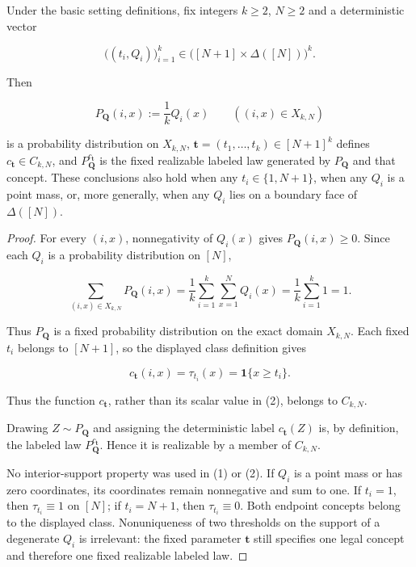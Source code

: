 \begin{lemma}\label{lem:step-006-fixed-product-realizable}
Under the basic setting definitions, fix integers \(k\ge2\), \(N\ge2\)
and a deterministic vector

\[
\bigl((t_i,Q_i)\bigr)_{i=1}^k
\in\bigl([N+1]\times\Delta([N])\bigr)^k.
\]

Then

\[
P_{\boldsymbol Q}(i,x):=\frac1kQ_i(x)
\qquad((i,x)\in X_{k,N})
\]

is a probability distribution on \(X_{k,N}\),
\(\boldsymbol t=(t_1,\ldots,t_k)\in[N+1]^k\) defines
\(c_{\boldsymbol t}\in C_{k,N}\), and
\(P_{\boldsymbol Q}^{c_{\boldsymbol t}}\) is the fixed realizable
labeled law generated by \(P_{\boldsymbol Q}\) and that concept. These
conclusions also hold when any \(t_i\in\{1,N+1\}\), when any \(Q_i\) is
a point mass, or, more generally, when any \(Q_i\) lies on a boundary face
of \(\Delta([N])\).
\end{lemma}

\begin{proof}
For every \((i,x)\), nonnegativity of \(Q_i(x)\) gives
\(P_{\boldsymbol Q}(i,x)\ge0\). Since each \(Q_i\) is a probability
distribution on \([N]\),

\[
\sum_{(i,x)\in X_{k,N}}P_{\boldsymbol Q}(i,x)
=\frac1k\sum_{i=1}^k\sum_{x=1}^NQ_i(x)
=\frac1k\sum_{i=1}^k1
=1.
\tag{1}
\]

Thus \(P_{\boldsymbol Q}\) is a fixed probability distribution on the
exact domain \(X_{k,N}\). Each fixed \(t_i\) belongs to \([N+1]\), so
the displayed class definition gives

\[
c_{\boldsymbol t}(i,x)=\tau_{t_i}(x)
=\mathbf 1\{x\ge t_i\}.
\tag{2}
\]

Thus the function \(c_{\boldsymbol t}\), rather than its scalar value in
(2), belongs to \(C_{k,N}\).

Drawing \(Z\sim P_{\boldsymbol Q}\) and assigning the deterministic label
\(c_{\boldsymbol t}(Z)\) is, by definition, the labeled law
\(P_{\boldsymbol Q}^{c_{\boldsymbol t}}\). Hence it is realizable by a
member of \(C_{k,N}\).

No interior-support property was used in (1) or (2). If \(Q_i\) is a point
mass or has zero coordinates, its coordinates remain nonnegative and sum to
one. If \(t_i=1\), then \(\tau_{t_i}\equiv1\) on \([N]\); if
\(t_i=N+1\), then \(\tau_{t_i}\equiv0\). Both endpoint concepts belong
to the displayed class. Nonuniqueness of two thresholds on the support of a
degenerate \(Q_i\) is irrelevant: the fixed parameter
\(\boldsymbol t\) still specifies one legal concept and therefore one
fixed realizable labeled law. \end{proof}

